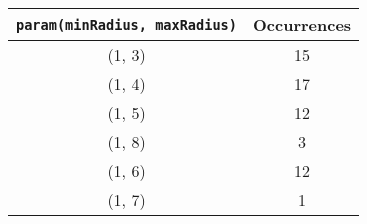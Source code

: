 \documentclass[letterpaper, 12pt]{article}
\begin{document}
\begin{longtable}{|c|c|}
\hline
\textbf{\texttt{param(minRadius, maxRadius)}} & \textbf{Occurrences} \\
\hline
(1, 3) & 15 \\
\hline
(1, 4) & 17 \\
\hline
(1, 5) & 12 \\
\hline
(1, 8) & 3 \\
\hline
(1, 6) & 12 \\
\hline
(1, 7) & 1 \\
\hline
\end{longtable}
\end{document}

